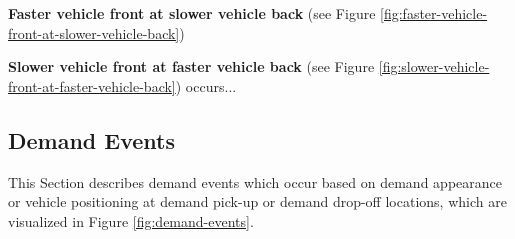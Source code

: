 \documentclass[graybox]{svmult}
\begin{document}
\noindent
\textbf{Faster vehicle front at slower vehicle back} (see Figure \ref{fig:faster-vehicle-front-at-slower-vehicle-back})

\vspace{4mm}

\noindent
\textbf{Slower vehicle front at faster vehicle back} (see Figure \ref{fig:slower-vehicle-front-at-faster-vehicle-back})
occurs...
\vspace{-2mm}

\subsection{Demand Events}
\label{sec:demand-events}
This Section describes demand events which occur based on demand appearance or vehicle positioning at demand pick-up or demand drop-off locations, which are visualized in Figure \ref{fig:demand-events}.
\vspace{4mm}
\end{document}
